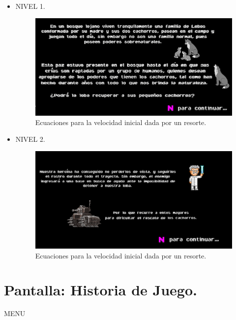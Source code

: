 \documentclass{article}
\begin{document}
\begin{itemize}
    \item NIVEL 1.
    
        \begin{figure}[h]
        \includegraphics[scale=0.5]{Images/pantallahistoria.png}
        \centering
        \caption{Ecuaciones para la velocidad inicial dada por un resorte.}
        \label{fig:ecuacionesresorte}
        \end{figure}
    
    \item NIVEL 2.
        \begin{figure}[h]
        \includegraphics[scale=0.5]{Images/pantallahistoria2.png}
        \centering
        \caption{Ecuaciones para la velocidad inicial dada por un resorte.}
        \label{fig:ecuacionesresorte}
        \end{figure}
    
\end{itemize}




\section{Pantalla: Historia de Juego.}
MENU
\end{document}
